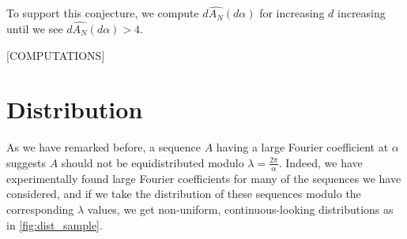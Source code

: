 \documentclass{report}
\theoremstyle{remark}
\numberwithin{equation}{section}
\begin{document}





To support this conjecture, we compute $d \widehat{A_N}(d\alpha)$ for
increasing $d$ increasing until we see $d \widehat{A_N}(d\alpha) >
4$.  



{\color{red}[COMPUTATIONS]}

\chapter{Distribution}

As we have remarked before, a sequence $A$ having a large Fourier
coefficient at $\alpha$ suggests $A$ should not be equidistributed
modulo $\lambda = \frac{2\pi}{\alpha}$.  Indeed, we have
experimentally found large Fourier coefficients for many of the
sequences we have considered, and if we take the distribution of these
sequences modulo the corresponding $\lambda$ values, we get
non-uniform, continuous-looking distributions as in \ref{fig:dist_sample}.
\end{document}
